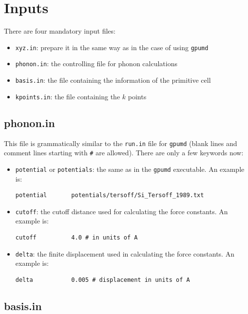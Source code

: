\documentclass[12pt,a4paper]{report}
\begin{document}
\section{Inputs}
There are four mandatory input files:
\begin{itemize}
\item \verb"xyz.in": prepare it in the same way as in the case of using \verb"gpumd"
\item \verb"phonon.in": the controlling file for phonon calculations
\item \verb"basis.in": the file containing the information of the primitive cell
\item \verb"kpoints.in": the file containing the $k$ points
\end{itemize}

\subsection{phonon.in}

This file is grammatically similar to the \verb"run.in" file for \verb"gpumd" (blank lines and comment lines starting with \verb"#" are allowed). There are only a few keywords now:
\begin{itemize}
\item \verb"potential"  or \verb"potentials": the same as in the \verb"gpumd" executable.
An example is:
\begin{verbatim}
potential       potentials/tersoff/Si_Tersoff_1989.txt
\end{verbatim}
\item \verb"cutoff": the cutoff distance used for calculating the force constants. An example is:
\begin{verbatim}
cutoff          4.0 # in units of A
\end{verbatim}
\item \verb"delta": the finite displacement used in calculating the force constants. An example is:
\begin{verbatim}
delta           0.005 # displacement in units of A
\end{verbatim}
\end{itemize}

\subsection{basis.in}
\end{document}
